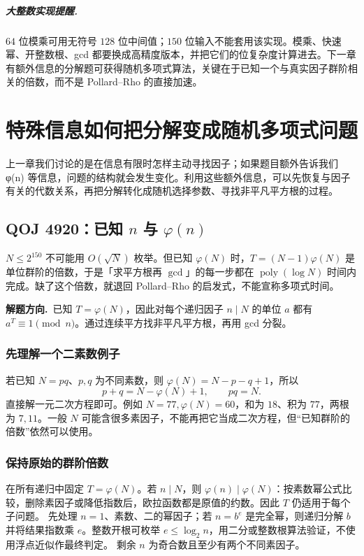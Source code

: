 \documentclass[UTF8,a4paper,11pt,twoside,openright,fontset=fandol]{ctexbook}
\theoremstyle{definition}
\newcommand{\hint}{\par\noindent\textbf{解题方向.}\ }
\begin{document}
\paragraph{大整数实现提醒.} $64$ 位模乘可用无符号 $128$ 位中间值；$150$ 位输入不能套用该实现。模乘、快速幂、开整数根、gcd 都要换成高精度版本，并把它们的位复杂度计算进去。下一章有额外信息的分解题可获得随机多项式算法，关键在于已知一个与真实因子群阶相关的倍数，而不是 Pollard--Rho 的直接加速。



\chapter{特殊信息如何把分解变成随机多项式问题}
\begin{chapterintro}[章节导读]
上一章我们讨论的是在信息有限时怎样主动寻找因子；如果题目额外告诉我们 φ(n) 等信息，问题的结构就会发生变化。利用这些额外信息，可以先恢复与因子有关的代数关系，再把分解转化成随机选择参数、寻找非平凡平方根的过程。
\end{chapterintro}

\section{QOJ 4920：已知 \texorpdfstring{$n$}{n} 与 \texorpdfstring{$\varphi(n)$}{phi(n)}}
\begin{tip}
$N\le2^{150}$ 不可能用 $O(\sqrt N)$ 枚举。但已知 $\varphi(N)$ 时，$T=(N-1)\varphi(N)$ 是单位群阶的倍数，于是「求平方根再 $\gcd$」的每一步都在 $\operatorname{poly}(\log N)$ 时间内完成。缺了这个倍数，就退回 Pollard--Rho 的启发式，不能宣称多项式时间。
\end{tip}

\hint 已知 $T=\varphi(N)$，因此对每个递归因子 $n\mid N$ 的单位 $a$ 都有 $a^T\equiv1\pmod n$。通过连续平方找非平凡平方根，再用 gcd 分裂。


\subsection{先理解一个二素数例子}
若已知 $N=pq$、$p,q$ 为不同素数，则 $\varphi(N)=N-p-q+1$，所以
\[
 p+q=N-\varphi(N)+1,\qquad pq=N.
\]
直接解一元二次方程即可。例如 $N=77,\varphi(N)=60$，和为 $18$、积为 $77$，两根为 $7,11$。一般 $N$ 可能含很多素因子，不能再把它当成二次方程，但“已知群阶的倍数”依然可以使用。

\subsection{保持原始的群阶倍数}
在所有递归中固定 $T=\varphi(N)$。若 $n\mid N$，则 $\varphi(n)\mid\varphi(N)$：按素数幂公式比较，删除素因子或降低指数后，欧拉函数都是原值的约数。因此 $T$ 仍适用于每个子问题。
先处理 $n=1$、素数、二的幂因子；若 $n=b^e$ 是完全幂，则递归分解 $b$ 并将结果指数乘 $e$。整数开根可枚举 $e\le\log_2n$，用二分或整数根算法验证，不使用浮点近似作最终判定。
剩余 $n$ 为奇合数且至少有两个不同素因子。
\end{document}

